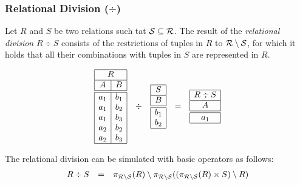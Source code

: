 

\subsubsection[Relational Division]{Relational Division ($\div$)}

Let $R$ and $S$ be two relations such tat $\mathcal{S} \subseteq \mathcal{R}$. The result of the \emph{relational division} $R \div S$ consists of the restrictions of tuples in $R$ to $\mathcal{R} \setminus \mathcal{S}$, for which it holds that all their combinations with tuples in $S$ are represented in $R$.

\[ \begin{array}{ccccc}
\begin{array}{|c|c|}\hline
\multicolumn{2}{|c|}{R} \\\hline
A & B \\\hline\hline
a_1 & b_1 \\
a_1 & b_2 \\
a_1 & b_3 \\
a_2 & b_2 \\
a_2 & b_3 \\\hline
\end{array}
& \div &
\begin{array}{|c|}\hline
S \\\hline
B \\\hline\hline
b_1 \\
b_2 \\\hline
\end{array}
& = &
\begin{array}{|c|}\hline
R \div S \\\hline
A \\\hline\hline
a_1 \\\hline
\end{array}
\end{array} \]

The relational division can be simulated with basic operators as follows:
\[ \begin{array}{rcl}
R \div  S & = & \pi_{\mathcal{R}\setminus\mathcal{S}}(R) \setminus \pi_{\mathcal{R}\setminus\mathcal{S}}((\pi_{\mathcal{R}\setminus\mathcal{S}}(R) \times S) \setminus R)
\end{array} \]




